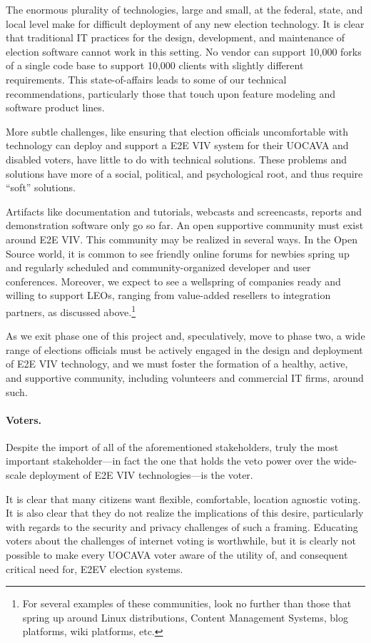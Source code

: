 The enormous plurality of technologies, large and small, at the
federal, state, and local level make for difficult deployment of any
new election technology. It is clear that traditional IT practices for
the design, development, and maintenance of election software cannot
work in this setting. No vendor can support 10,000 forks of a single
code base to support 10,000 clients with slightly different
requirements. This state-of-affairs leads to some of our technical
recommendations, particularly those that touch upon feature modeling
and software product lines.

More subtle challenges, like ensuring that election officials
uncomfortable with technology can deploy and support a E2E VIV system
for their UOCAVA and disabled voters, have little to do with technical
solutions. These problems and solutions have more of a social,
political, and psychological root, and thus require ``soft''
solutions.

Artifacts like documentation and tutorials, webcasts and screencasts,
reports and demonstration software only go so far. An open supportive
community must exist around E2E VIV.  This community may be realized
in several ways.  In the Open Source world, it is common to see
friendly online forums for newbies spring up and regularly scheduled
and community-organized developer and user conferences.  Moreover, we
expect to see a wellspring of companies ready and willing to support
LEOs, ranging from value-added resellers to integration partners, as
discussed above.\footnote{For several examples of these communities,
  look no further than those that spring up around Linux
  distributions, Content Management Systems, blog platforms, wiki
  platforms, etc.}
  
As we exit phase one of this project and, speculatively, move to phase
two, a wide range of elections officials must be actively engaged in
the design and deployment of E2E VIV technology, and we must foster
the formation of a healthy, active, and supportive community,
including volunteers and commercial IT firms, around such.

\paragraph{Voters.} Despite the import of all of the aforementioned
stakeholders, truly the most important stakeholder---in fact the one
that holds the veto power over the wide-scale deployment of E2E VIV
technologies---is the voter.

It is clear that many citizens want flexible, comfortable, location
agnostic voting.  It is also clear that they do not realize the
implications of this desire, particularly with regards to the security
and privacy challenges of such a framing.  Educating voters about the
challenges of internet voting is worthwhile, but it is clearly not
possible to make every UOCAVA voter aware of the utility of, and
consequent critical need for, E2EV election systems.

